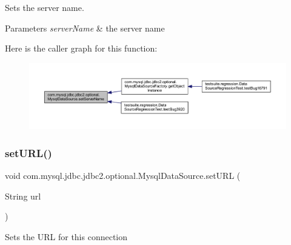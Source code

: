 Sets the server name.


\begin{DoxyParams}{Parameters}
{\em server\+Name} & the server name \\
\hline
\end{DoxyParams}
Here is the caller graph for this function\+:
\nopagebreak
\begin{figure}[H]
\begin{center}
\leavevmode
\includegraphics[width=350pt]{classcom_1_1mysql_1_1jdbc_1_1jdbc2_1_1optional_1_1_mysql_data_source_aa9b7531972e6bf6b0c4488bf41307581_icgraph}
\end{center}
\end{figure}
\mbox{\label{classcom_1_1mysql_1_1jdbc_1_1jdbc2_1_1optional_1_1_mysql_data_source_a44602f5e80027ae517af85b710e5651f}} 
\subsubsection{\texorpdfstring{set\+U\+R\+L()}{setURL()}}
{\footnotesize\ttfamily void com.\+mysql.\+jdbc.\+jdbc2.\+optional.\+Mysql\+Data\+Source.\+set\+U\+RL (\begin{DoxyParamCaption}\item[{String}]{url }\end{DoxyParamCaption})}

Sets the U\+RL for this connection


